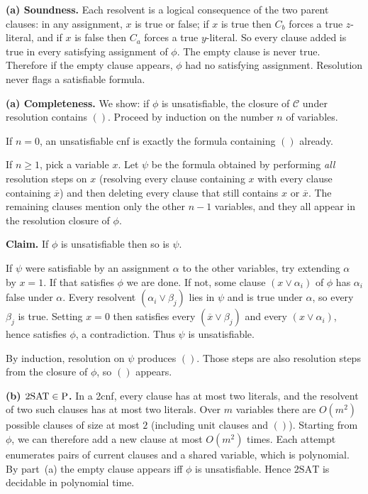 \begin{soln}
\textbf{(a) Soundness.}
Each resolvent is a logical consequence of the two parent clauses: in any assignment, $x$ is true or false; if $x$ is true then $C_b$ forces a true $z$-literal, and if $x$ is false then $C_a$ forces a true $y$-literal. So every clause added is true in every satisfying assignment of $\phi$. The empty clause is never true. Therefore if the empty clause appears, $\phi$ had no satisfying assignment. Resolution never flags a satisfiable formula.

\textbf{(a) Completeness.}
We show: if $\phi$ is unsatisfiable, the closure of $\mathcal{C}$ under resolution contains $()$. Proceed by induction on the number $n$ of variables.

If $n=0$, an unsatisfiable cnf is exactly the formula containing $()$ already.

If $n\ge 1$, pick a variable $x$. Let $\psi$ be the formula obtained by performing \emph{all} resolution steps on $x$ (resolving every clause containing $x$ with every clause containing $\overline{x}$) and then deleting every clause that still contains $x$ or $\overline{x}$. The remaining clauses mention only the other $n-1$ variables, and they all appear in the resolution closure of $\phi$.

\textbf{Claim.} If $\phi$ is unsatisfiable then so is $\psi$.

If $\psi$ were satisfiable by an assignment $\alpha$ to the other variables, try extending $\alpha$ by $x=1$. If that satisfies $\phi$ we are done. If not, some clause $(x\lor\alpha_i)$ of $\phi$ has $\alpha_i$ false under $\alpha$. Every resolvent $(\alpha_i\lor\beta_j)$ lies in $\psi$ and is true under $\alpha$, so every $\beta_j$ is true. Setting $x=0$ then satisfies every $(\overline{x}\lor\beta_j)$ and every $(x\lor\alpha_i)$, hence satisfies $\phi$, a contradiction. Thus $\psi$ is unsatisfiable.

By induction, resolution on $\psi$ produces $()$. Those steps are also resolution steps from the closure of $\phi$, so $()$ appears.

\textbf{(b) $\mathrm{2SAT}\in\mathrm{P}$.}
In a 2cnf, every clause has at most two literals, and the resolvent of two such clauses has at most two literals. Over $m$ variables there are $O(m^2)$ possible clauses of size at most $2$ (including unit clauses and $()$). Starting from $\phi$, we can therefore add a new clause at most $O(m^2)$ times. Each attempt enumerates pairs of current clauses and a shared variable, which is polynomial. By part~(a) the empty clause appears iff $\phi$ is unsatisfiable. Hence $\mathrm{2SAT}$ is decidable in polynomial time.
\end{soln}

